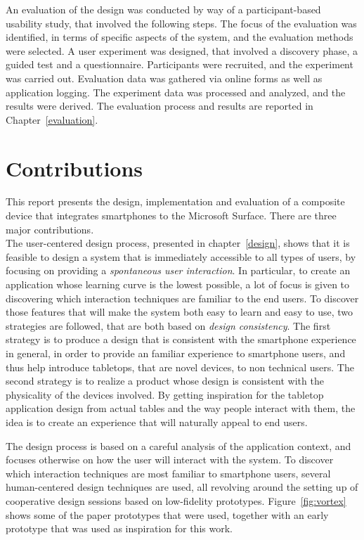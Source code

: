 An evaluation of the design was conducted by way of a participant-based usability study, that involved the following steps.
The focus of the evaluation was identified, in terms of specific aspects of the system, and the evaluation methods were selected.
A user experiment was designed, that involved a discovery phase, a guided test and a questionnaire.
Participants were recruited, and the experiment was carried out.
Evaluation data was gathered via online forms as well as application logging.
The experiment data was processed and analyzed, and the results were derived.
The evaluation process and results are reported in Chapter~\ref{evaluation}.

\section{Contributions}

This report presents the design, implementation and evaluation of a composite device that integrates smartphones to the Microsoft Surface.
There are three major contributions.
\\
\linebreak
The user-centered design process, presented in chapter~\ref{design}, shows that it is feasible to design a system that is immediately accessible to all types of users, by focusing on providing a \emph{spontaneous user interaction}.
In particular, to create an application whose learning curve is the lowest possible, a lot of focus is given to discovering which interaction techniques are familiar to the end users.
To discover those features that will make the system both easy to learn and easy to use, two strategies are followed, that are both based on \emph{design consistency}.
The first strategy is to produce a design that is consistent with the smartphone experience in general, in order to provide an familiar experience to smartphone users, and thus help introduce tabletops, that are novel devices, to non technical users.
The second strategy is to realize a product whose design is consistent with the physicality of the devices involved.
By getting inspiration for the tabletop application design from actual tables and the way people interact with them, the idea is to create an experience that will naturally appeal to end users. 

The design process is based on a careful analysis of the application context, and focuses otherwise on how the user will interact with the system.
To discover which interaction techniques are most familiar to smartphone users, several human-centered design techniques are used, all revolving around the setting up of cooperative design sessions based on low-fidelity prototypes.
Figure~\ref{fig:vortex} shows some of the paper prototypes that were used, together with an early prototype that was used as inspiration for this work.

